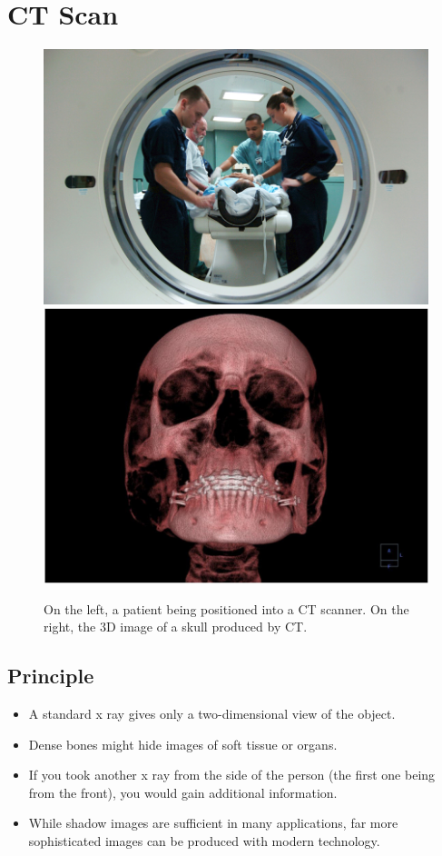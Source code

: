 \documentclass[12pt]{book}
\begin{document}
\section{CT Scan}
\begin{figure}[h]
\includegraphics[scale=0.53]{ct-mach}
\includegraphics[scale=0.49]{ct-scan}
\caption{On the left, a patient being positioned into a CT scanner.
On  the right, the 3D image of a skull produced by CT.}
\end{figure}
\subsection{Principle}
\begin{itemize}
\item A standard x ray gives only a two-dimensional view of the object.
\item Dense bones might hide images of soft tissue or organs.
\item If you took another x ray from the side of the person (the first one being from the front), you would gain additional information.
\item While shadow images are sufficient in many applications, far more sophisticated images can be produced with modern technology.
\end{itemize}
\end{document}
